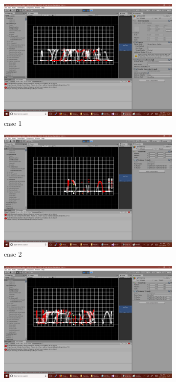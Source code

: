 \begin{figure}[h]
	\centering
	\begin{subfigure}[h]{0.3\textwidth}
		\centering
		\includegraphics[width=\textwidth]{Figures/HeatmapOrig.png}
		\caption{case 1}
		\label{}
	\end{subfigure}
	\begin{subfigure}[h]{0.3\textwidth}
		\centering
		\includegraphics[width=\textwidth]{Figures/HeatmapNgram.png}
		\caption{case 2}
		\label{}
	\end{subfigure}
	\begin{subfigure}[h]{0.3\textwidth}
		\centering
		\includegraphics[width=\textwidth]{Figures/HeatmapGhost.png}

\end{subfigure}
\end{figure}
